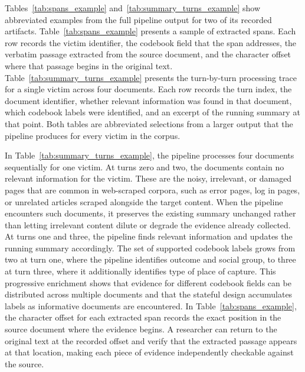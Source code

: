 \documentclass{article}
\begin{document}
Tables~\ref{tab:spans_example} and~\ref{tab:summary_turns_example} show abbreviated examples from the full pipeline output for two of its recorded artifacts. Table~\ref{tab:spans_example} presents a sample of extracted spans. Each row records the victim identifier, the codebook field that the span addresses, the verbatim passage extracted from the source document, and the character offset where that passage begins in the original text. Table~\ref{tab:summary_turns_example} presents the turn-by-turn processing trace for a single victim across four documents. Each row records the turn index, the document identifier, whether relevant information was found in that document, which codebook labels were identified, and an excerpt of the running summary at that point. Both tables are abbreviated selections from a larger output that the pipeline produces for every victim in the corpus.

In Table~\ref{tab:summary_turns_example}, the pipeline processes four documents sequentially for one victim. At turns zero and two, the documents contain no relevant information for the victim. These are the noisy, irrelevant, or damaged pages that are common in web-scraped corpora, such as error pages, log in pages, or unrelated articles scraped alongside the target content. When the pipeline encounters such documents, it preserves the existing summary unchanged rather than letting irrelevant content dilute or degrade the evidence already collected. At turns one and three, the pipeline finds relevant information and updates the running summary accordingly. The set of supported codebook labels grows from two at turn one, where the pipeline identifies outcome and social group, to three at turn three, where it additionally identifies type of place of capture. This progressive enrichment shows that evidence for different codebook fields can be distributed across multiple documents and that the stateful design accumulates labels as informative documents are encountered. In Table~\ref{tab:spans_example}, the character offset for each extracted span records the exact position in the source document where the evidence begins. A researcher can return to the original text at the recorded offset and verify that the extracted passage appears at that location, making each piece of evidence independently checkable against the source.
\end{document}
